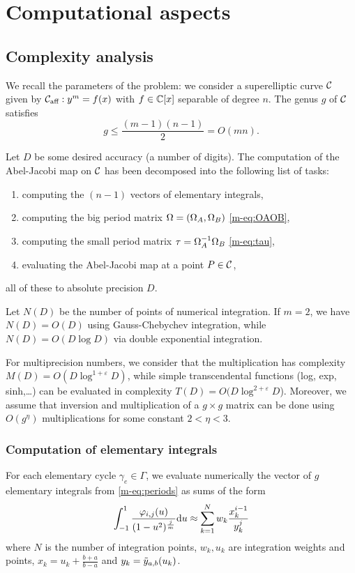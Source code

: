 \documentclass[main.tex]{subfiles}
\begin{document}
  \section{Computational aspects}

   \subsection{Complexity analysis}

   We recall the parameters of the problem: we consider a superelliptic curve $\mathcal{C}$ given by
   $\mathcal{C}_{\text{aff}}:y^m=f(x)$ with $f \in \mathbb{C}[x]$ separable of degree $n$. The genus $g$ of $\mathcal{C}$ satisfies
   $$g \leq \frac{(m-1)(n-1)}2=O(mn).$$

   Let $D$ be some desired accuracy (a number of digits). The computation of
   the Abel-Jacobi map on $\mathcal{C}$ has been decomposed into the
   following list of tasks:
   \begin{enumerate}
       \item computing the $(n-1)$ vectors of elementary integrals,
       \item computing the big period matrix $\Omega=(\Omega_A,\Omega_B)$ \eqref{m-eq:OAOB},
       \item computing the small period matrix $\tau = \Omega_A^{-1}\Omega_B$ \eqref{m-eq:tau},
       \item evaluating the Abel-Jacobi map at a point $P \in \mathcal{C}$,
   \end{enumerate}
   all of these to absolute precision $D$.

   Let $N(D)$ be the number of points of numerical integration.
   If $m=2$, we have
   $N(D)=O(D)$ using Gauss-Chebychev integration, while $N(D)=O(D\log D)$
   via double exponential integration.

   For multiprecision numbers, we consider that the multiplication has
   complexity $M(D)=O(D \log^{1+\varepsilon}D)$,
   while simple transcendental functions (log, exp, sinh,\dots) can be evaluated
   in complexity $T(D)=O(D\log^{2+\varepsilon} D$).
    Moreover, we assume that inversion and multiplication of a $g \times g$ matrix can be done using
    $O(g^{\eta})$ multiplications for some constant $2 < \eta < 3$.
   
   \subsubsection{Computation of elementary integrals}

   For each elementary cycle $\gamma_e\in \Gamma$, we evaluate numerically the vector of $g$
   elementary integrals from \eqref{m-eq:periods} as sums of the form
   \begin{equation}
       \int_{-1}^1\frac{\varphi_{i,j}(u)}{(1-u^2)^{\frac jm}}\mathrm d u
           \approx \sum_{k=1}^N w_k\frac{x_k^{i-1}}{y_k^j}
   \end{equation}
   where $N$ is the number of integration points, $w_k,u_k$ are integration weights and points,
   $x_k=u_k+\frac{b+a}{b-a}$ and $y_k=\tilde{y}_{a,b}(u_k)$.
\end{document}
